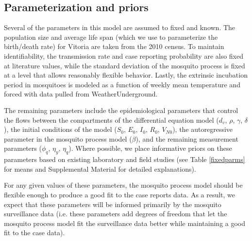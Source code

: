 \documentclass[10pt,letterpaper]{article}
\begin{document}
\subsection*{Parameterization and priors}

Several of the parameters in this model are assumed to fixed and known. 
The population size and average life span (which we use to parameterize the birth/death rate) for Vitoria are taken from the 2010 census.
To maintain identifiability, the transmission rate and case reporting probability are also fixed at literature values, while the standard deviation of the mosquito process is fixed at a level that allows reasonably flexible behavior.
Lastly, the extrinsic incubation period in mosquitoes is modeled as a function of weekly mean temperature and forced with data pulled from WeatherUnderground.

The remaining parameters include the epidemiological parameters that control the flows between the compartments of the differential equation model ($d_v$, $\rho$, $\gamma$, $\delta$), the initial conditions of the model ($S_0$, $E_0$, $I_0$, $R_0$, $V_{N0}$), the autoregressive parameter in the mosquito process model ($\beta$), and the remaining measurement parameters ($\phi_q$, $\eta_y$, $\eta_q$).  
Where possible, we place informative priors on these parameters based on existing laboratory and field studies (see Table \ref{fixedparms} for means and Supplemental Material for detailed explanations).

For any given values of these parameters, the mosquito process model should be flexible enough to produce a good fit to the case reports data.
As a result, we expect that these parameters will be informed primarily by the mosquito surveillance data (i.e. these parameters add degrees of freedom that let the mosquito process model fit the surveillance data better while maintaining a good fit to the case data).
\end{document}
